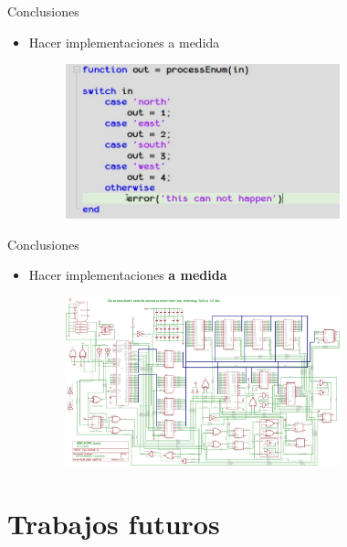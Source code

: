 \documentclass{beamer}
\begin{document}
\begin{frame}{Conclusiones}
    \begin{itemize}
        \item Hacer implementaciones a medida
        \begin{figure}[H]
            \centering\includegraphics[width=0.75\textwidth]{simple-logic}
        \end{figure}
    \end{itemize}
\end{frame}

\begin{frame}{Conclusiones}
    \begin{itemize}
        \item Hacer implementaciones \textbf{a medida}
        \begin{figure}[H]
            \centering\includegraphics[width=0.75\textwidth]{complex-logic}
        \end{figure}
    \end{itemize}
\end{frame}

\section{Trabajos futuros}
\end{document}

